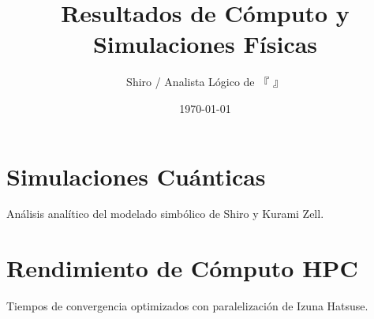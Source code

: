 \documentclass{article}
\title{Resultados de Cómputo y Simulaciones Físicas}
\author{Shiro / Analista Lógico de 『 』}
\date{\today}
\begin{document}
\maketitle

\section{Simulaciones Cuánticas}
Análisis analítico del modelado simbólico de Shiro y Kurami Zell.

\section{Rendimiento de Cómputo HPC}
Tiempos de convergencia optimizados con paralelización de Izuna Hatsuse.
\end{document}
